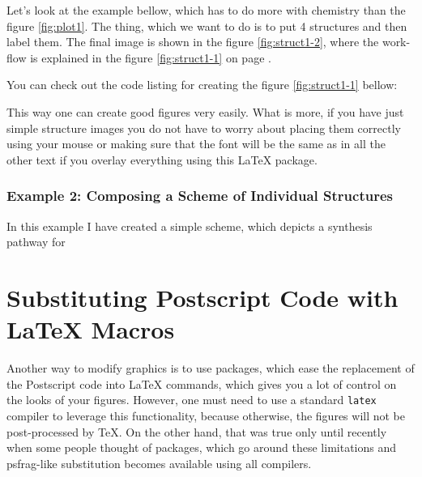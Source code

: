 \documentclass[
]{scrartcl}
\begin{document}
%
Let's look at the example bellow, which has to do more with chemistry than the
    figure \ref{fig:plot1}.
%
The thing, which we want to do is to put 4 structures and then label them.
%
The final image is shown in the figure \ref{fig:struct1-2}, where the work-flow
    is explained in the figure \ref{fig:struct1-1} on page
    \pageref{fig:struct1-1}.

%


%
You can check out the code listing for creating the figure \ref{fig:struct1-1}
    bellow:
    

%

%
This way one can create good figures very easily.
%
What is more, if you have just simple structure images you do not have to worry
    about placing them correctly using your mouse or making sure that the font
    will be the same as in all the other text if you overlay everything using
    this \LaTeX{} package.

%

%
\subsubsection{Example 2: Composing a Scheme of Individual Structures}

%
In this example I have created a simple scheme, which depicts a synthesis
    pathway for 

%



\clearpage
\section{Substituting Postscript Code with \LaTeX{} Macros}

%
Another way to modify graphics is to use packages, which ease the replacement of
    the Postscript code into \LaTeX{} commands, which gives you a lot of control
    on the looks of your figures.
%
However, one must need to use a standard \verb|latex| compiler to leverage this
    functionality, because otherwise, the  figures will not be
    post-processed by \TeX{}.
%
On the other hand, that was true only until recently when some people thought of
    packages, which go around these limitations and psfrag-like substitution
    becomes available using all compilers.
\end{document}
